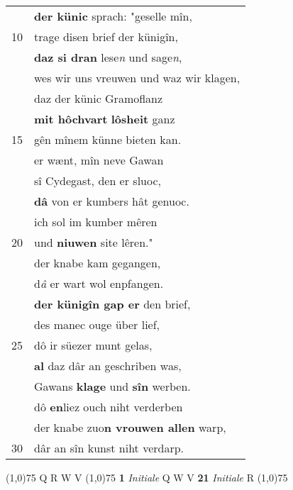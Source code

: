 \documentclass[8pt,a4paper,notitlepage]{article}
\begin{document}
\begin{table}[ht]
\begin{minipage}[t]{0.5\linewidth}
\begin{tabular}{rl}
 & \textbf{der künic} sprach: "geselle mîn,\\ 
10 & trage disen brief der künigîn,\\ 
 & \textbf{daz si dran} lese\textit{n} und sage\textit{n},\\ 
 & wes wir uns vreuwen und waz wir klagen,\\ 
 & daz der künic Gramoflanz\\ 
 & \textbf{mit hôchvart} \textbf{lôsheit} ganz\\ 
15 & gên mînem künne bieten kan.\\ 
 & er wænt, mîn neve Gawan\\ 
 & sî Cydegast, den er sluoc,\\ 
 & \textbf{dâ} von er kumbers hât genuoc.\\ 
 & ich sol im kumber mêren\\ 
20 & und \textbf{niuwen} site lêren."\\ 
 & der knabe kam gegangen,\\ 
 & d\textit{â} er wart wol enpfangen.\\ 
 & \textbf{der künigîn gap er} den brief,\\ 
 & des manec ouge über lief,\\ 
25 & dô ir süezer munt gelas,\\ 
 & \textbf{al} daz dâr an geschriben was,\\ 
 & Gawans \textbf{klage} und \textbf{sîn} werben.\\ 
 & dô \textbf{en}liez ouch niht verderben\\ 
 & der knabe zuo\textbf{n vrouwen allen} warp,\\ 
30 & dâr an sîn kunst niht verdarp.\\ 
\end{tabular}
\scriptsize
\line(1,0){75} \newline
Q R W V \newline
\line(1,0){75} \newline
\textbf{1} \textit{Initiale} Q W V  \textbf{21} \textit{Initiale} R  \newline
\line(1,0){75} \newline

\end{minipage}
\end{table}
\end{document}
